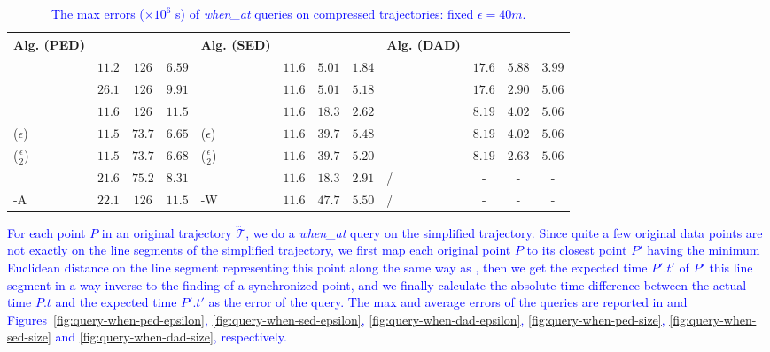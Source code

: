 {\begin{table}
	\caption{\small \textcolor{blue}{The max errors {($\times 10^6$ s)} of \emph{when\_at} queries on compressed trajectories: fixed $\epsilon=40m$.}}
	\centering
	\scriptsize
	\vspace{-1ex}
	\begin{tabular}{|l|c|c|c|l|c|c|c|l|c|c|c|}
		\hline
		\bf{Alg. (PED)}  &\ucar &\geolife &\mopsi & \bf{Alg. (SED)}  &\ucar &\geolife &\mopsi &\bf{Alg. (DAD)}  &\ucar &\geolife &\mopsi \\
		\hline
		{\dpa} &	$11.2$ & $126$ &	$6.59  $	&\dpa &$11.6  $ &$5.01  $ & $1.84 $ & \dpa	& $17.6 $	& $5.88 $	& $3.99 $ \\
		\hline
		{\tpa} &	$26.1$ & $126  $ &	$9.91  $	&\tpa 	& $11.6  $& $5.01  $ &$5.18 $ & \tpa	& $ 17.6 $	& $ 2.90 $	& $ 5.06  $ \\
		\hline
		{\bqsa} &	$11.6$ & $126 $ &	$ 11.5 $	&\squishe &$11.6  $ & $ 18.3  $ & $2.62 $ & \opwa	& $8.19 $	& $ 4.02$	& $5.06 $ \\
		\hline
		{\siped($\epsilon$)} &	$11.5$ & $73.7  $ &	$6.65  $	&\cised($\epsilon$) & $ 11.6 $ &$ 39.7	  $ &$5.48 $ & \interval& $8.19 $	& $4.02 $	& $ 5.06 $ \\
		\hline
		{\siped($\frac{\epsilon}{2}$)} &	$11.5$ & $73.7 $ &	$ 6.68 $ &\cised($\frac{\epsilon}{2}$) &$ 11.6 $ & {$39.7$} & $5.20 $& \intersec	& $ 8.19 $	& $ 2.63 $	& $ 5.06 $ \\
		\hline
		{\operb} &	$21.6 $ & $75.2 $ & $8.31 $	& {\dagots} &$11.6$ &$18.3$ & $2.91$ & /&- &- &- \\
		\hline
		{\operb-A} &	${22.1} $ & ${126} $ & ${11.5} $	&  {\cised-W} &$11.6$ &$47.7$ &$5.50$ & / &- &- &- \\
		\hline
	\end{tabular}
	\label{tab:query-when-me}
	\vspace{-1ex}
\end{table}








\textcolor{blue}{For each point $P$ in an original trajectory $\dddot{\mathcal{T}}$, we do a \emph{when\_at} query on the simplified trajectory. Since quite a few original data points are not exactly on the line segments of the simplified trajectory, we first map each original point $P$ to its closest point $P'$ having the minimum Euclidean distance on the line segment representing this point along the same way as \cite{Cao:Spatio}, then we get the expected time $P'.t'$ of $P'$ \wrt this line segment in a way inverse to the finding of a synchronized point, and we finally calculate the absolute time difference between the actual time $P.t$ and the expected time $P'.t'$ as the error of the query.}
%
\textcolor{blue}{The max and average errors of the queries are reported in  and Figures~\ref{fig:query-when-ped-epsilon}, \ref{fig:query-when-sed-epsilon}, \ref{fig:query-when-dad-epsilon}, \ref{fig:query-when-ped-size}, \ref{fig:query-when-sed-size} and \ref{fig:query-when-dad-size}, respectively.}




}
